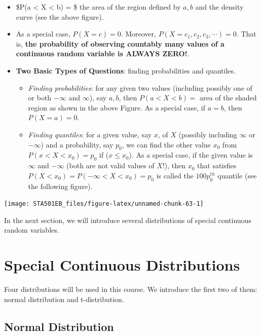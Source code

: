 \documentclass[
]{book}
\begin{document}
\begin{itemize}
\item
  \$P(a \textless{} X \textless{} b) = \$ the area of the region defined by \(a, b\) and the density curve (see the above figure).
\item
  As a special case, \(P(X = c) = 0\). Moreover, \(P(X=c_1, c_2, c_3,\cdots )=0\). That is, \textbf{the probability of observing countably many values of a continuous random variable is ALWAYS ZERO!}.
\item
  \textbf{Two Basic Types of Questions}: finding probabilities and quantiles.

  \begin{itemize}
  \item
    \emph{Finding probabilities}: for any given two values (including possibly one of or both \(-\infty\) and \(\infty\)), say \(a, b\), then \(P(a<X<b)=\) area of the shaded region as shown in the above Figure. As a special case, if \(a = b\), then \(P(X = a) = 0\).
  \item
    \emph{Finding quantiles}: for a given value, say \(x\), of \(X\) (possibly including \(\infty\) or \(-\infty\)) and a probability, say \(p_0\), we can find the other value \(x_0\) from \(P(x < X < x_0) = p_0\) if (\(x \le x_0\)). As a special case, if the given value is \(\infty\) and \(-\infty\) (both are not valid values of \(X\)!), then \(x_0\) that satisfies \(P(X < x_0) = P(-\infty<X<x_0) = p_0\) is called the \(100p_0^{th}\) quantile (see the following figure).
  \end{itemize}
\end{itemize}

\begin{center}\texttt{[image: STA501EB\_files/figure-latex/unnamed-chunk-63-1]} \end{center}

In the next section, we will introduce several distributions of special continuous random variables.

\hypertarget{special-continuous-distributions}{%
\section{Special Continuous Distributions}\label{special-continuous-distributions}}

Four distributions will be used in this course. We introduce the first two of them: normal distribution and t-distribution.

\hypertarget{normal-distribution}{%
\subsection{Normal Distribution}\label{normal-distribution}}
\end{document}
